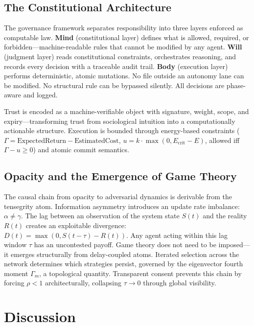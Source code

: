 \documentclass[10pt,twocolumn]{article}
\theoremstyle{definition}
\theoremstyle{remark}
\begin{document}
\subsection{The Constitutional Architecture}

The governance framework separates responsibility into three layers enforced as computable law.  \textbf{Mind} (constitutional layer) defines what is allowed, required, or forbidden---machine-readable rules that cannot be modified by any agent.  \textbf{Will} (judgment layer) reads constitutional constraints, orchestrates reasoning, and records every decision with a traceable audit trail.  \textbf{Body} (execution layer) performs deterministic, atomic mutations.  No file outside an autonomy lane can be modified.  No structural rule can be bypassed silently.  All decisions are phase-aware and logged.

Trust is encoded as a machine-verifiable object with signature, weight, scope, and expiry---transforming trust from sociological intuition into a computationally actionable structure.  Execution is bounded through energy-based constraints ($\Gamma = \mathrm{ExpectedReturn} - \mathrm{EstimatedCost}$, $u = k \cdot \max(0, E_{\mathrm{crit}} - E)$, allowed iff $\Gamma - u \ge 0$) and atomic commit semantics.

\subsection{Opacity and the Emergence of Game Theory}

The causal chain from opacity to adversarial dynamics is derivable from the tensegrity atom.  Information asymmetry introduces an update rate imbalance: $\alpha \neq \gamma$.  The lag between an observation of the system state $S(t)$ and the reality $R(t)$ creates an exploitable divergence: $D(t) = \max(0, S(t - \tau) - R(t))$.  Any agent acting within this lag window $\tau$ has an uncontested payoff.  Game theory does not need to be imposed---it emerges structurally from delay-coupled atoms.  Iterated selection across the network determines which strategies persist, governed by the eigenvector fourth moment $\Gamma_m$, a topological quantity.  Transparent consent prevents this chain by forcing $\rho < 1$ architecturally, collapsing $\tau \to 0$ through global visibility.

\section{Discussion}\label{sec:discussion}
\end{document}
